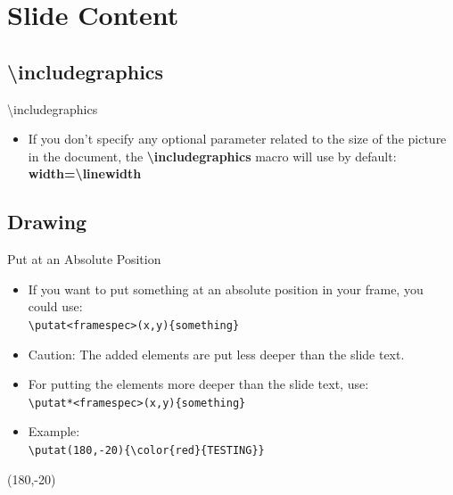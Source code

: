 \documentclass[english,sectioncirclenumberstyle]{ciadbeamer}
\begin{document}
\section{Slide Content}
\tableofcontentslide[sectionstyle={show/shaded},subsectionstyle={show/show/hide},subsubsectionstyle={hide/hide/hide/hide},sections={3-}]

\subsection{{\textbackslash}includegraphics}
\tableofcontentslide[sectionstyle={show/shaded},subsectionstyle={show/shaded/hide},subsubsectionstyle={hide/hide/hide/hide},sections={3-}]

\begin{frame}{{\textbackslash}includegraphics}
	\begin{itemize}
	\vspace{2em}
	\item If you don't specify any optional parameter related to the size of the picture in the document, the \textbf{{\textbackslash}includegraphics} macro will use by default: \\
		\textbf{width={\textbackslash}linewidth}
	\end{itemize}
\end{frame}

\subsection{Drawing}
\tableofcontentslide[sectionstyle={show/shaded},subsectionstyle={show/shaded/hide},subsubsectionstyle={hide/hide/hide/hide},sections={3-}]

\begin{frame}{Put at an Absolute Position}
	\begin{itemize}
	\item If you want to put something at an absolute position in your frame, you could use: \\
		\texttt{{\textbackslash}putat<framespec>(x,y)\{something\}}
	\item \alert{Caution: The added elements are put less deeper than the slide text.}
	\item For putting the elements more deeper than the slide text, use: \\
		\texttt{{\textbackslash}putat*<framespec>(x,y)\{something\}}
	\vspace{1em}
	\item Example: \\
		\texttt{{\textbackslash}putat(180,-20)\{{\textbackslash}color\{red\}\{TESTING\}\}}
	\end{itemize}
	\putat(180,-20){\color{red}{TESTING}}
\end{frame}
\end{document}
